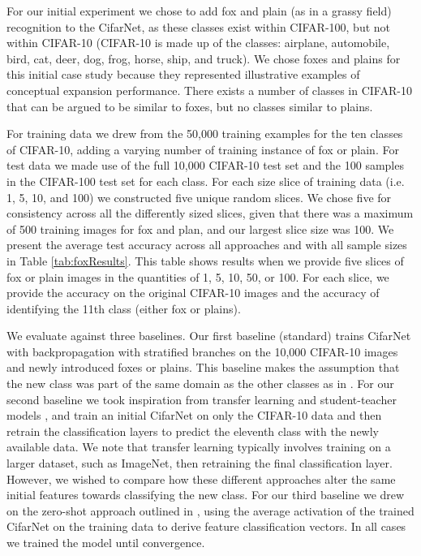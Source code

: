 \documentclass[letterpaper]{article}
\begin{document}
For our initial experiment we chose to add fox and plain (as in a grassy field) recognition to the CifarNet, as these classes exist within CIFAR-100, but not within CIFAR-10 
(CIFAR-10 is made up of the classes: airplane, automobile, bird, cat, deer, dog, frog, horse, ship, and truck).
We chose foxes and plains for this initial case study because they represented illustrative examples of conceptual expansion performance. 
There exists a number of classes in CIFAR-10 that can be argued to be similar to foxes, but no classes similar to plains.

For training data we drew from the 50,000 training examples for the ten classes of CIFAR-10, adding a varying number of training instance of fox or plain. 
For test data we made use of the full 10,000 CIFAR-10 test set and the 100 samples in the CIFAR-100 test set for each class. 
For each size slice of training data (i.e. 1, 5, 10, and 100) we constructed five unique random slices. 
We chose five for consistency across all the differently sized slices, given that there was a maximum of 500 training images for fox and plan, and our largest slice size was 100.
We present the average test accuracy across all approaches and with all sample sizes in Table \ref{tab:foxResults}. 
This table shows results when we provide five slices of fox or plain images in the quantities of 1, 5, 10, 50, or 100. 
For each slice, we provide the accuracy on the original CIFAR-10 images and the accuracy of identifying the 11th class (either fox or plains).

We evaluate against three baselines. 
Our first baseline (standard) trains CifarNet with backpropagation with stratified branches on the 10,000 CIFAR-10 images and newly introduced foxes or plains.
This baseline makes the assumption that the new class was part of the same domain as the other classes as in \cite{daume2009frustratingly}. 
%
For our second baseline we took inspiration from transfer learning and student-teacher models \cite{wong2016sequence,li2017large,furlanello2017born}, and train an initial CifarNet on only the CIFAR-10 data and then retrain the classification layers to predict the eleventh class with the newly available data. 
We note that transfer learning typically involves training on a larger dataset, such as ImageNet, then retraining the final classification layer. 
However, we wished to compare how these different approaches alter the same initial features towards classifying the new class. 
For our third baseline we drew on the zero-shot approach outlined in \cite{chao2016empirical}, using the average activation of the trained CifarNet on the training data to derive feature classification vectors. 
In all cases we trained the model until convergence. 
\end{document}
